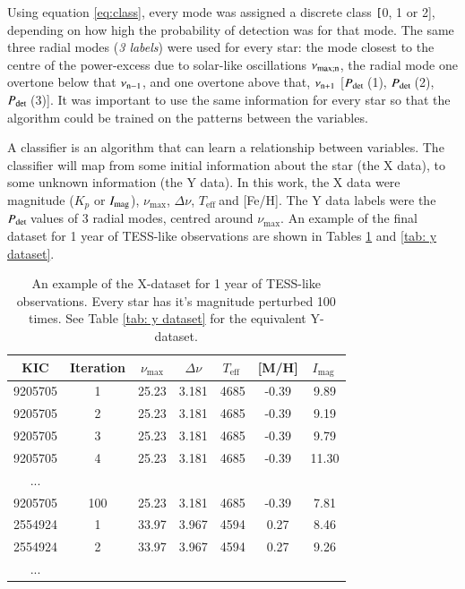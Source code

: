 \documentclass[a4paper,fleqn,usenatbib,useAMS]{mnras}
\newcommand{\numax}{\ensuremath{\nu_{\textrm{max}}}}
\newcommand{\dnu}{\ensuremath{\Delta\nu}}
\newcommand{\teff}{\ensuremath{T_{\textrm{eff}}\:}}
\newcommand{\pdet}{\ensuremath{P_{\rm det}\:}}
\newcommand{\imag}{\ensuremath{I_{\textrm{mag}}\:}}
\begin{document}
Using equation \ref{eq:class}, every mode was assigned a discrete class {\texttt [0, 1 or 2]}, depending on how high the probability of detection was for that mode. The same three radial modes ({\it 3 labels}) were used for every star: the mode closest to the centre of the power-excess due to solar-like oscillations $\nu_{\rm max; n}$, the radial mode one overtone below that $\nu_{\rm n-1}$, and one overtone above that, $\nu_{\rm n+1}$ [\pdet(1), \pdet(2), \pdet(3)]. It was important to use the same information for every star so that the algorithm could be trained on the patterns between the variables.

A classifier is an algorithm that can learn a relationship between variables. The classifier will map from some initial information about the star (the X data), to some unknown information (the Y data). In this work, the X data were magnitude ($K_{p}$ or $I_{\rm mag}$), \numax, \dnu, \teff and [Fe/H]. The Y data labels were the \pdet values of 3 radial modes, centred around \numax. An example of the final dataset for 1 year of TESS-like observations are shown in Tables \ref{tab: x dataset} and \ref{tab: y dataset}.





\begin{table}
\begin{center}
\begin{tabular}{|*{7}{c|}}
KIC     & Iteration & \numax & \dnu & \teff & [M/H] & \imag \\
\hline
9205705	& 1         & 25.23	& 3.181 & 4685 & -0.39 & 9.89  \\
9205705	& 2         & 25.23	& 3.181 & 4685 & -0.39 & 9.19  \\
9205705	& 3         & 25.23	& 3.181 & 4685 & -0.39 & 9.79  \\
9205705	& 4         & 25.23	& 3.181 & 4685 & -0.39 & 11.30 \\
...                                                        \\
9205705	& 100       & 25.23	& 3.181 & 4685 & -0.39 & 7.81  \\
2554924	& 1	        & 33.97	& 3.967 	& 4594 &  0.27 & 8.46  \\
2554924	& 2         & 33.97	& 3.967 	& 4594 &  0.27 & 9.26  \\
...                                                         \\
\hline
\end{tabular}
\end{center}
\caption{An example of the X-dataset for 1 year of TESS-like observations. Every star has it's magnitude perturbed 100 times. See Table \ref{tab: y dataset} for the equivalent Y-dataset.}
\label{tab: x dataset}
\end{table}
\end{document}
